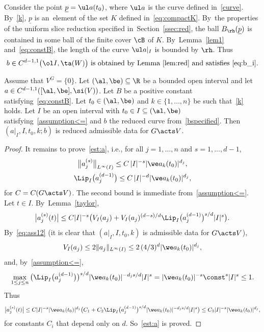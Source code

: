 Consider the point $\underline p = \ul a(t_0)$, where $\ul a$ is the curve defined in~\eqref{curve}. By~\eqref{k},
$\underline p$ is an~ele\-ment of the set $K$ defined in~\eqref{eq:compactK}. By~the properties of the uniform slice reduction specified in~Section~\ref{ssec:red},
the ball $B_\rh(\underline p)$ is contained in some ball of the finite cover $\cB$ of $K$. By~Lemma~\ref{lem1} and~\eqref{eq:constB},
the length of the curve $\ul a|_I$ is bounded by $\rh$.
Thus
\begin{gather} \label{bspecified}
 \text{$b \in C^{d-1,1}\big(\ol I,\ta(W)\big)$ is obtained by Lemma~\ref{lem:red} and satisfies~\eqref{eq:b_i}.}
\end{gather}




\begin{Lemma} \label{lem:assThm1implyassProp3}
	Assume that $V^G = \{0\}$.
 Let $(\al,\be) \subseteq \R$ be a bounded open interval and let $a \in C^{d-1,1}([\al,\be],\si(V))$.
 Let $B$ be a positive constant satisfying~\eqref{eq:constB}.
 Let $t_0 \in (\al,\be)$ and $k \in \{1,\dots,n\}$ be such that~\eqref{k} holds.
 Let $I$ be an open interval with $t_0 \in I \subseteq (\al,\be)$ satisfying~\eqref{assumption<=}
 and $b$ the reduced curve from~\eqref{bspecified}.
 Then $(a|_I,I,t_0,k;b)$ is reduced admissible data for $G \acts V$.
\end{Lemma}

\begin{proof}
	It remains to prove~\eqref{est:a}, i.e.,
	for all
	$ j = 1,\dots,n$ and $ s = 1,\dots,d-1$,
 \begin{gather*}%
 \big\|a_j^{(s)} \big\|_{L^\infty(I)} \le C\, |I|^{-s} |\we a_k (t_0)|^{d_j},
 \\
 \Lip_I \big(a_j^{(d-1)}\big) \le C\, |I|^{-d} |\we a_k (t_0)|^{d_j},
 \end{gather*}	
 for $C = C(G \acts V)$.	
 The second bound is immediate from~\eqref{assumption<=}.
Let $t \in I$. By~Lemma~\ref{taylor},
 \begin{gather*}
 \big| a_j^{(s)}(t) \big| \le C |I|^{-s} \bigl( V_I(a_j)
 + V_I(a_j)^{(d-s)/d} \Lip_I\big(a_j^{(d-1)}\big)^{s/d} |I|^s\bigr).
 \end{gather*}
By~\eqref{eq:ass12} (it is clear that $(a|_I,I,t_0,k)$ is admissible data for $G \acts V$),
\begin{gather*}
 V_I(a_j) \le 2 \|a_j\|_{L^{\infty}(I)} \le 2\, (4/3)^d |\we a_k (t_0)|^{d_j},
\end{gather*}
and, by~\eqref{assumption<=},
\begin{gather*}
 \max_{1 \le j\le n} \big(\Lip_I\big(a_j^{(d-1)}\big)\big)^{s/d} |\we a_k (t_0)|^{-d_j s/d} |I|^s
 = |\we a_k (t_0)|^{-s} \const^s |I|^s \le 1.
\end{gather*}
Thus
\begin{gather*}
\big | a_j^{(s)}(t) \big| \le C |I|^{-s}
 |\we a_k (t_0)|^{d_j} \big(C_1 + C_2 \Lip_I\big(a_j^{(d-1)}\big)^{s/d} |\we a_k (t_0)|^{-d_j s/d} |I|^s \big)
\le C_3 |I|^{-s} |\we a_k (t_0)|^{d_j},
\end{gather*}
for constants $C_i$ that depend only on $d$.
So~\eqref{est:a} is proved.
\end{proof}

